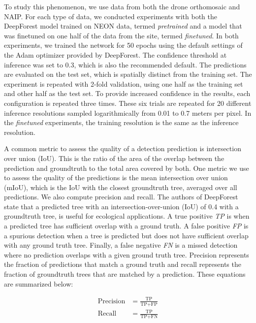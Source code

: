 To study this phenomenon, we use data from both the drone orthomosaic and NAIP. For each type of data, we conducted experiments with both the DeepForest model trained on NEON data, termed \textit{pretrained} and a model that was finetuned on one half of the data from the site, termed \textit{finetuned}. In both experiments, we trained the network for 50 epochs using the default settings of the Adam \cite{} optimizer provided by DeepForest. The confidence threshold at inference was set to 0.3, which is also the recommended default. The predictions are evaluated on the test set, which is spatially distinct from the training set. The experiment is repeated with 2-fold validation, using one half as the training set and other half as the test set. To provide increased confidence in the results, each configuration is repeated three times. These six trials are repeated for 20 different inference resolutions sampled logarithmically from 0.01 to 0.7 meters per pixel. In the \textit{finetuned} experiments, the training resolution is the same as the inference resolution.

A common metric to assess the quality of a detection prediction is intersection over union (IoU). This is the ratio of the area of the overlap between the prediction and groundtruth to the total area covered by both. One metric we use to assess the quality of the predictions is the mean intersection over union (mIoU), which is the IoU with the closest groundtruth tree, averaged over all predictions. We also compute precision and recall. 
The authors of DeepForest state that a predicted tree with an intersection-over-union (IoU) of 0.4 with a groundtruth tree, is useful for ecological applications. A true positive \textit{TP} is when a predicted tree has sufficient overlap with a ground truth. A false positive \textit{FP} is a spurious detection when a tree is predicted but does not have sufficient overlap with any ground truth tree. Finally, a false negative \textit{FN} is a missed detection where no prediction overlaps with a given ground truth tree. Precision represents the fraction of predictions that match a ground truth and recall represents the fraction of groundtruth trees that are matched by a prediction. These equations are summarized below:

\begin{align*}
\textrm{Precision} &= \frac{\textrm{TP}}{\textrm{TP}+\textrm{FP}}\\
\textrm{Recall} &= \frac{\textrm{TP}}{\textrm{TP}+\textrm{FN}}
\end{align*}

